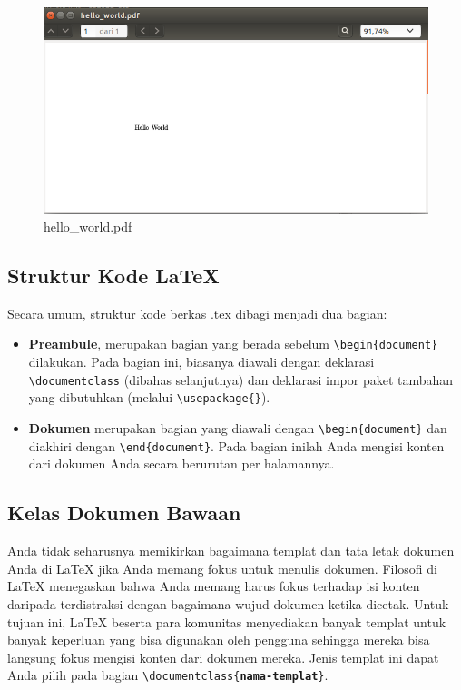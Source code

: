 \documentclass{ta-its}
\begin{document}
		\begin{figure}[h]
			\centering
			\includegraphics[width=\linewidth]{contoh_img/hello_world.pdf.png}
			\caption{hello\_world.pdf}
			\label{gambarHelloWorldPDF}
		\end{figure}
		
		\subsection{Struktur Kode \LaTeX}
		Secara umum, struktur kode berkas .tex dibagi menjadi dua bagian:
		
		\begin{itemize}
			\item \textbf{Preambule}, merupakan bagian yang berada sebelum \texttt{\textbackslash{}begin\{document\}} dilakukan. Pada bagian ini, biasanya diawali dengan deklarasi \texttt{\textbackslash{}documentclass} (dibahas selanjutnya) dan deklarasi impor paket tambahan yang dibutuhkan (melalui \texttt{\textbackslash{}usepackage\{\}}).
			\item \textbf{Dokumen} merupakan bagian yang diawali dengan \texttt{\textbackslash{}begin\{document\}} dan diakhiri dengan \texttt{\textbackslash{}end\{document\}}. Pada bagian inilah Anda mengisi konten dari dokumen Anda secara berurutan per halamannya.
		\end{itemize}
        
        \subsection{Kelas Dokumen Bawaan}
        
        Anda tidak seharusnya memikirkan bagaimana templat dan tata letak dokumen Anda di \LaTeX{} jika Anda memang fokus untuk menulis dokumen. Filosofi di \LaTeX{} menegaskan bahwa Anda memang harus fokus terhadap isi konten daripada terdistraksi dengan bagaimana wujud dokumen ketika dicetak. Untuk tujuan ini, \LaTeX{} beserta para komunitas menyediakan banyak templat untuk banyak keperluan yang bisa digunakan oleh pengguna sehingga mereka bisa langsung fokus mengisi konten dari dokumen mereka. Jenis templat ini dapat Anda pilih pada bagian \texttt{\textbackslash{}documentclass\{\textbf{nama-templat}\}}.
        
\end{document}

